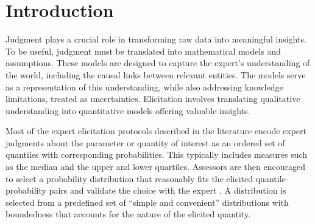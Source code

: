 \documentclass[
  fleqn,
  deca,
  blindrev
]{informs4}
\begin{document}
\maketitle

\section{Introduction}\label{introduction}

Judgment plays a crucial role in transforming raw data into meaningful
insights. To be useful, judgment must be translated into mathematical
models and assumptions. These models are designed to capture the
expert's understanding of the world, including the causal links between
relevant entities. The models serve as a representation of this
understanding, while also addressing knowledge limitations, treated as
uncertainties. Elicitation involves translating qualitative
understanding into quantitative models offering valuable insights.

Most of the expert elicitation protocols described in the literature
\citep{hanea2021ExpertJudgementRisk, gosling2018SHELFSheffieldElicitation, ohagan2006UncertainJudgementsEliciting, hemming2018PracticalGuideStructured, morgan2014UseAbuseExpert, welsh2018MoreorlessElicitationMOLE, spetzler1975ProbabilityEncodingDecision}
encode expert judgments about the parameter or quantity of interest as
an ordered set of quantiles with corresponding probabilities. This
typically includes measures such as the median and the upper and lower
quartiles. Assessors are then encouraged to select a probability
distribution that reasonably fits the elicited quantile-probability
pairs and validate the choice with the expert
\citep{gosling2018SHELFSheffieldElicitation}. A distribution is selected
from a predefined set of ``simple and convenient'' distributions
\citep{ohagan2006UncertainJudgementsEliciting} with boundedness that
accounts for the nature of the elicited quantity.
\end{document}
